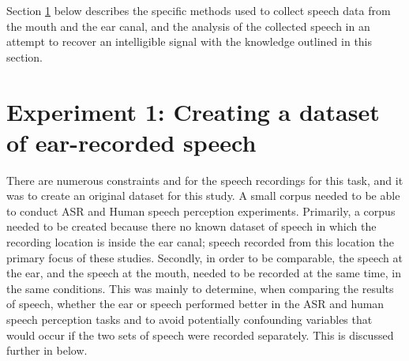 Section \ref{expt1} below describes the specific methods used to collect speech data from the mouth and the ear canal, and the analysis of the collected speech in an attempt to recover an intelligible signal with the knowledge outlined in this section.


\DIFdelbegin %
\DIFdelend \DIFaddbegin \section{Experiment 1: Creating a dataset of ear-recorded speech}\label{expt1}
\DIFaddend 

There are numerous constraints and \DIFdelbegin {}\DIFdelend \DIFaddbegin {}\DIFaddend for the speech recordings \DIFdelbegin {}\DIFdelend \DIFaddbegin {}\DIFaddend for this task, and it was \DIFdelbegin {}\DIFdelend \DIFaddbegin {}\DIFaddend to create an original dataset for this study.  A small corpus \DIFdelbegin {}\DIFdelend \DIFaddbegin {}\DIFaddend needed to be able to conduct ASR and Human speech perception experiments.  Primarily, a corpus needed to be created because there \DIFdelbegin {}\DIFdelend \DIFaddbegin {}\DIFaddend no known dataset of speech in which the recording location is inside the ear canal; speech recorded from this location \DIFdelbegin {}\DIFdelend \DIFaddbegin {}\DIFaddend the primary focus of these studies.  Secondly, in order to be comparable, the speech at the ear, and the speech at the mouth, needed to be recorded at the same time, in the same conditions.  This was mainly to determine, when comparing the results of \DIFdelbegin {}\DIFdelend \DIFaddbegin {}\DIFaddend speech, whether the ear or \DIFdelbegin {}\DIFdelend \DIFaddbegin {}\DIFaddend speech performed better in the ASR and human speech perception tasks and to avoid potentially confounding variables that would occur if the two sets of speech were recorded separately. This is discussed further in \DIFdelbegin {}\DIFdelend \DIFaddbegin {}\DIFaddend below.


